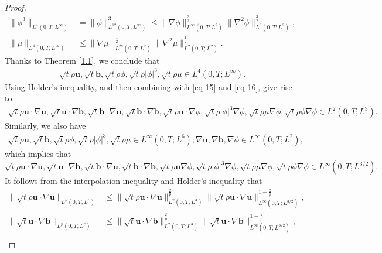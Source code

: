 \documentclass[11pt]{article}
\numberwithin{equation}{section}
\begin{document}
\begin{proof}
\begin{align*}
\|\phi^3\|_{L^4(0,T;L^\infty)}&=\|\phi\|^3_{L^{12}(0,T;L^\infty)}\leq \|\nabla \phi\|_{L^\infty(0,T;L^2)}^{\frac{3}{2}} \|\nabla^2 \phi\|_{L^{6}(0,T;L^2)}^{\frac{3}{2}},\\
\|\mu\|_{L^4(0,T;L^\infty)} &\leq \|\nabla \mu\|_{L^\infty(0,T;L^2)}^{\frac{1}{2}} \|\nabla^2 \mu\|_{L^2(0,T;L^2)}^{\frac{1}{2}}.
\end{align*}
Thanks to Theorem  \ref{1.1}, we conclude that
\begin{align}
\sqrt{t}\rho \mathbf{u}, \sqrt{t} \mathbf{b}, \sqrt{t}\rho \phi,\sqrt{t}\rho |\phi|^3,\sqrt{t}\rho \mu\in L^4(0,T;L^\infty).
\end{align}
Using Holder's inequality, and then combining with \eqref{eq-15} and \eqref{eq-16}, give rise to
\begin{align*}
\sqrt{t}\rho \mathbf{u} \cdot \nabla \mathbf{u}, \sqrt{t}\mathbf{u} \cdot \nabla \mathbf{b}, \sqrt{t}\mathbf{b} \cdot \nabla \mathbf{u}, \sqrt{t}\mathbf{b} \cdot \nabla \mathbf{b}, \sqrt{t}\rho \mathbf{u}\cdot  \nabla \phi,\sqrt{t}\rho |\phi|^3\nabla \phi,\sqrt{t}\rho \mu  \nabla \phi,\sqrt{t}\rho\phi\nabla \phi \in L^2(0,T;L^3).
\end{align*}
Similarly, we also have
\begin{align*}
\sqrt{t}\rho \mathbf{u}, \sqrt{t}\mathbf{b}, \sqrt{t}\rho \phi,\sqrt{t}\rho |\phi|^3,\sqrt{t}\rho\mu\in L^\infty(0,T;L^6);
\nabla \mathbf{u}, \nabla \mathbf{b}, \nabla \phi \in L^\infty(0,T;L^2),
\end{align*}
which implies that
\begin{equation*}
\sqrt{t}\rho \mathbf{u}\cdot \nabla\mathbf{u}, \sqrt{t}\mathbf{u} \cdot \nabla \mathbf{b}, \sqrt{t}\mathbf{b} \cdot \nabla \mathbf{u}, \sqrt{t}\mathbf{b} \cdot \nabla \mathbf{b}, \sqrt{t}\rho \mathbf{u} \nabla \phi ,\sqrt{t}\rho |\phi|^3\nabla \phi,\sqrt{t}\rho \mu \nabla \phi,\sqrt{t}\rho\phi\nabla \phi\in L^\infty(0, T; L^{3/2}).
\end{equation*}
It follows from the interpolation inequality and Holder's inequality that
\begin{align*}
\|\sqrt{t}\rho \mathbf{u} \cdot \nabla \mathbf{u}\|_{L^p(0,T;L^r)} &\leq \|\sqrt{t}\rho \mathbf{u} \cdot \nabla \mathbf{u}\|_{L^2(0,T;L^3)}^{\frac{2}{p}} \|\sqrt{t}\rho \mathbf{u} \cdot \nabla \mathbf{u}\|_{L^\infty(0,T;L^{3/2})}^{1 - \frac{2}{p}}, \\
\|\sqrt{t}\mathbf{u} \cdot \nabla \mathbf{b}\|_{L^p(0,T;L^r)} &\leq \|\sqrt{t} \mathbf{u} \cdot \nabla \mathbf{b}\|_{L^2(0,T;L^3)}^{\frac{2}{p}} \|\sqrt{t} \mathbf{u} \cdot \nabla \mathbf{b}\|_{L^\infty(0,T;L^{3/2})}^{1 - \frac{2}{p}}, \\

\end{align*}
\end{proof}
\end{document}
